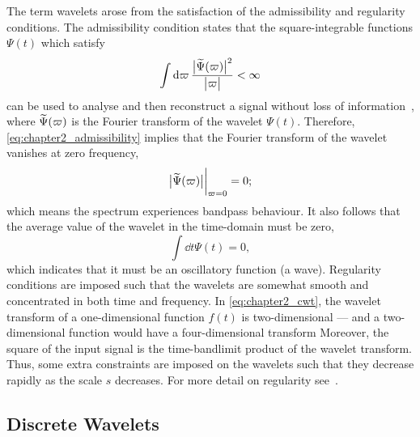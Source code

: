 The term wavelets arose from the satisfaction of the admissibility and regularity conditions.
The admissibility condition states that the square-integrable functions \(\Psi(t)\) which satisfy
%
\begin{equation}\label{eq:chapter2_admissibility}
    \int\dd{\varpi} \frac{\big\lvert\widetilde{\Psi}(\varpi)\big\rvert^{2}}{\big\lvert\varpi\big\rvert}
    < \infty
\end{equation}
%
can be used to analyse and then reconstruct a signal without loss of information~\cite{Sheng2010}, where \(\widetilde{\Psi}(\varpi)\) is the Fourier transform of the wavelet \(\Psi(t)\).
Therefore, \cref{eq:chapter2_admissibility} implies that the Fourier transform of the wavelet vanishes at zero frequency, \ie{}
%
\begin{equation}
    \big\lvert\widetilde{\Psi}(\varpi)\big\rvert \bigg\rvert_{\varpi=0}
    = 0;
\end{equation}
%
which means the spectrum experiences bandpass behaviour.
It also follows that the average value of the wavelet in the time-domain must be zero, \ie{}
%
\begin{equation}
    \int\dd{t} \Psi(t)
    = 0,
\end{equation}
%
which indicates that it must be an oscillatory function (a wave).
Regularity conditions are imposed such that the wavelets are somewhat smooth and concentrated in both time and frequency.
In \cref{eq:chapter2_cwt}, the wavelet transform of a one-dimensional function \(f(t)\) is two-dimensional --- and a two-dimensional function would have a four-dimensional transform \etc{}
Moreover, the square of the input signal is the time-bandlimit product of the wavelet transform.
Thus, some extra constraints are imposed on the wavelets such that they decrease rapidly as the scale \(s\) decreases.
For more detail on regularity see~\cite{Burrus1997,Daubechies1992}.

\subsection{Discrete Wavelets}\label{sec:chapter2_discrete_wavelets}

